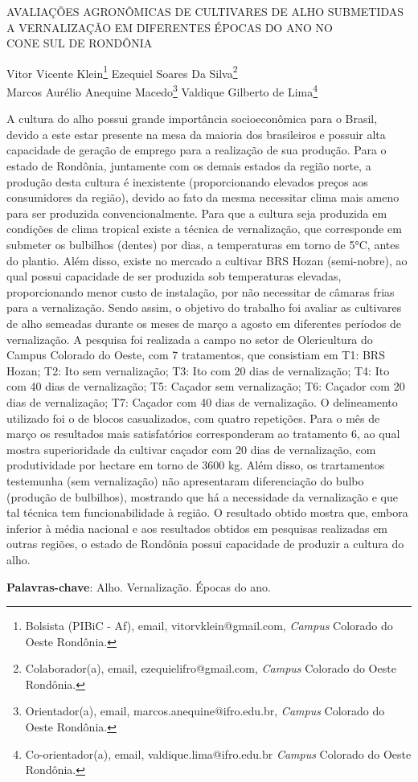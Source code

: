 \documentclass[article,12pt,onesidea,4paper,english,brazil]{abntex2}
\begin{document}
	
	
	\frenchspacing 
	
	\begin{center}
		\LARGE AVALIAÇÕES AGRONÔMICAS DE CULTIVARES DE ALHO SUBMETIDAS A
		VERNALIZAÇÃO EM DIFERENTES ÉPOCAS DO ANO NO\\CONE SUL DE	
		RONDÔNIA
		
		\normalsize
		Vitor Vicente Klein\footnote{Bolsista (PIBiC - Af), email, vitorvklein@gmail.com, \textit{Campus} Colorado do Oeste Rondônia.} 
		Ezequiel Soares Da Silva\footnote{Colaborador(a), email, ezequielifro@gmail.com, \textit{Campus} Colorado do Oeste Rondônia.} \\
		Marcos Aurélio Anequine Macedo\footnote{Orientador(a), email, marcos.anequine@ifro.edu.br, \textit{Campus} Colorado do Oeste Rondônia.} 
		Valdique Gilberto de Lima\footnote{Co-orientador(a), email, valdique.lima@ifro.edu.br \textit{Campus} Colorado do Oeste Rondônia.} 
	\end{center}
	
	\noindent A cultura do alho possui grande importância socioeconômica para o Brasil, devido a
	este estar presente na mesa da maioria dos brasileiros e possuir alta capacidade de
	geração de emprego para a realização de sua produção. Para o estado de
	Rondônia, juntamente com os demais estados da região norte, a produção desta
	cultura é inexistente (proporcionando elevados preços aos consumidores da região),
	devido ao fato da mesma necessitar clima mais ameno para ser produzida
	convencionalmente. Para que a cultura seja produzida em condições de clima
	tropical existe a técnica de vernalização, que corresponde em submeter os bulbilhos
	(dentes) por dias, a temperaturas em torno de 5°C, antes do plantio. Além disso,
	existe no mercado a cultivar BRS Hozan (semi-nobre), ao qual possui capacidade de
	ser produzida sob temperaturas elevadas, proporcionando menor custo de
	instalação, por não necessitar de câmaras frias para a vernalização. Sendo assim, o
	objetivo do trabalho foi avaliar as cultivares de alho semeadas durante os meses de
	março a agosto em diferentes períodos de vernalização. A pesquisa foi realizada a
	campo no setor de Olericultura do Campus Colorado do Oeste, com 7 tratamentos,
	que consistiam em T1: BRS Hozan; T2: Ito sem vernalização; T3: Ito com 20 dias de
	vernalização; T4: Ito com 40 dias de vernalização; T5: Caçador sem vernalização;
	T6: Caçador com 20 dias de vernalização; T7: Caçador com 40 dias de vernalização.
	O delineamento utilizado foi o de blocos casualizados, com quatro repetições. Para o
	mês de março os resultados mais satisfatórios corresponderam ao tratamento 6, ao
	qual mostra superioridade da cultivar caçador com 20 dias de vernalização, com
	produtividade por hectare em torno de 3600 kg. Além disso, os trartamentos
	testemunha (sem vernalização) não apresentaram diferenciação do bulbo (produção
	de bulbilhos), mostrando que há a necessidade da vernalização e que tal técnica
	tem funcionabilidade à região. O resultado obtido mostra que, embora inferior à
	média nacional e aos resultados obtidos em pesquisas realizadas em outras regiões,
	o estado de Rondônia possui capacidade de produzir a cultura do alho.
	
	\vspace{\onelineskip}
	
	\noindent
	\textbf{Palavras-chave}: Alho. Vernalização. Épocas do ano.
	
\end{document}

